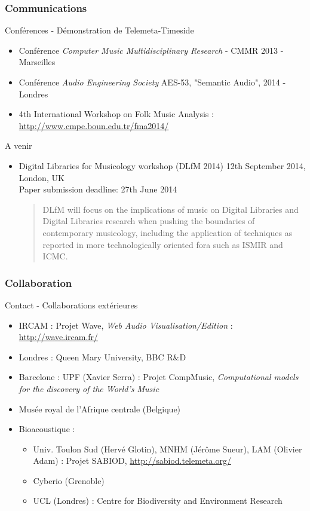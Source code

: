 \documentclass[10pt, final, hyperref, table]{beamer}
\begin{document}
\begin{frame}
\frametitle{Communications}
\begin{block}{Conférences - Démonstration de Telemeta-Timeside}
  \begin{itemize}
  \item Conférence \emph{Computer Music Multidisciplinary Research} - CMMR 2013 - Marseilles
  \item Conférence \emph{Audio Engineering Society} AES-53, "Semantic Audio", 2014 - Londres 
\item 4th International Workshop on Folk Music Analysis :\\ 
\url{http://www.cmpe.boun.edu.tr/fma2014/}
  \end{itemize}
\end{block}
\begin{block}{A venir}
  \begin{itemize}
  \item Digital Libraries for Musicology workshop (DLfM 2014) 12th
    September 2014, London, UK\\

\alert{Paper submission deadline: 27th June 2014}
\begin{quotation}
  DLfM will focus on the implications of music on Digital Libraries
  and Digital Libraries research when pushing the boundaries of
  contemporary musicology, including the application of techniques as
  reported in more technologically oriented fora such as ISMIR and ICMC.
\end{quotation}

  \end{itemize}

\end{block}

\end{frame}
\begin{frame}\frametitle{Collaboration}
\begin{block}{Contact - Collaborations extérieures}
  \begin{itemize}
  \item IRCAM : Projet Wave, \emph{Web Audio Visualisation/Edition} : \url{http://wave.ircam.fr/}
  \item Londres : Queen Mary University, BBC R\&D
  \item Barcelone : UPF (Xavier Serra) :  Projet CompMusic, \emph{Computational models for the discovery of the World’s Music}
  \item Musée royal de l'Afrique centrale (Belgique)
  \item Bioacoustique :
    \begin{itemize}
    \item Univ. Toulon Sud (Hervé Glotin), MNHM (Jérôme Sueur), LAM
      (Olivier Adam) : Projet SABIOD,
      \url{http://sabiod.telemeta.org/}
    \item Cyberio (Grenoble)
    \item UCL (Londres) : Centre for Biodiversity and Environment Research
    \end{itemize}

  \end{itemize}
\end{block}
\end{frame}
\end{document}
